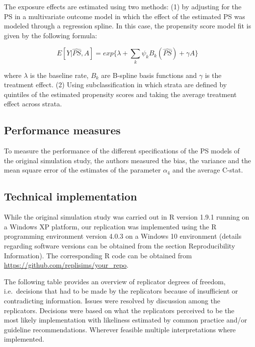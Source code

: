 \documentclass[10,a4paperpaper,]{article}
\begin{document}
The exposure effects are estimated using two methods: (1) by adjusting
for the PS in a multivariate outcome model in which the effect of the
estimated PS was modeled through a regression spline. In this case, the
propensity score model fit is given by the following formula:

\[
E[Y|\hat{PS},A] = exp \{ \lambda + \sum_k \psi_k B_k(\hat{PS}) + \gamma A \}
\]

where \(\lambda\) is the baseline rate, \(B_k\) are B-spline basis
functions and \(\gamma\) is the treatment effect. (2) Using
subclassification in which strata are defined by quintiles of the
estimated propensity scores and taking the average treatment effect
across strata.

\subsection{Performance measures}

To measure the performance of the different specifications of the PS
models of the original simulation study, the authors measured the bias,
the variance and the mean square error of the estimates of the parameter
\(\alpha_{4}\) and the average C-stat.

\subsection{Technical implementation}

While the original simulation study was carried out in R version 1.9.1
running on a Windows XP platform, our replication was implemented using
the R programming environment version 4.0.3 on a Windows 10 environment
(details regarding software versions can be obtained from the section
Reproducibility Information). The corresponding R code can be obtained
from \url{https://github.com/replisims/your_repo}.

The following table provides an overview of replicator degrees of
freedom, i.e.~decisions that had to be made by the replicators because
of insufficient or contradicting information. Issues were resolved by
discussion among the replicators. Decisions were based on what the
replicators perceived to be the most likely implementation with
likeliness estimated by common practice and/or guideline
recommendations. Wherever feasible multiple interpretations where
implemented.
\end{document}
